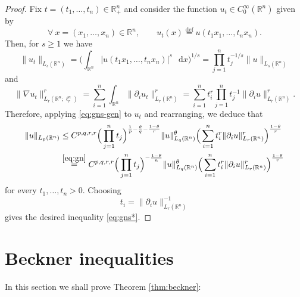 \documentclass[a4paper,twoside,11pt,reqno]{amsart}
\newcommand{\eqdef}{\stackrel{\mathrm{def}}{=}}
\newcommand*\diff{\mathop{}\!\mathrm{d}}
\newcommand{\R}{\mathbb{R}} %
\begin{document}
\begin{proof}
Fix $t=(t_1,\ldots,t_n)\in\R_+^n$ and consider the function $u_t\in C_0^\infty(\R^n)$ given by 
\begin{equation}
\forall \ x=(x_1,\ldots,x_n)\in\R^n, \qquad u_t(x)\eqdef u(t_1x_1,\ldots,t_nx_n).
\end{equation}
Then, for $s\geq1$ we have 
\begin{equation}
\|u_t\|_{L_s(\R^n)} = \Big( \int_{\R^n} |u(t_1x_1,\ldots,t_nx_n)|^s\,\diff x \Big)^{1/s} = \prod_{j=1}^n t_j^{-1/s} \|u\|_{L_s(\R^n)}
\end{equation}
and
\begin{equation}
\|\nabla u_t\|_{L_r(\R^n;\ell_r^n)}^r = \sum_{i=1}^n \int_{\R^n} \|\partial_i u_t\|_{L_r(\R^n)}^r = \sum_{i=1}^n t_i^r \prod_{j=1}^n t_j^{-1} \|\partial_i u\|_{L_r(\R^n)}^r.
\end{equation}
Therefore, applying \eqref{eq:gns-gen} to $u_t$ and rearranging, we deduce that
\begin{equation}
\begin{split}
\|u\|_{L_p(\R^n)} & \leq C^{p,q,r,r} \Big( \prod_{j=1}^nt_j \Big)^{\frac{1}{p}-\frac{\theta}{q}-\frac{1-\theta}{r}} \|u\|_{L_q(\R^n)}^\theta \Big( \sum_{i=1}^n t_i^r \|\partial_i u\|_{L_r(\R^n)}^r\Big)^{\frac{1-\theta}{r}}
\\ & \stackrel{\eqref{eq:gn}}{=} C^{p,q,r,r} \Big( \prod_{j=1}^n t_j\Big)^{-\frac{1-\theta}{n}} \|u\|_{L_q(\R^n)}^\theta \Big( \sum_{i=1}^n t_i^r \|\partial_i u\|_{L_r(\R^n)}^r\Big)^{\frac{1-\theta}{r}}
\end{split}
\end{equation}
for every $t_1,\ldots,t_n>0$. Choosing
\begin{equation}
t_i = \|\partial_iu\|_{L_r(\R^n)}^{-1}
\end{equation} 
gives the desired inequality \eqref{eq:gns*}.
\end{proof}



\section{Beckner inequalities} \label{sec:beckner}

In this section we shall prove Theorem \ref{thm:beckner}:
\end{document}
